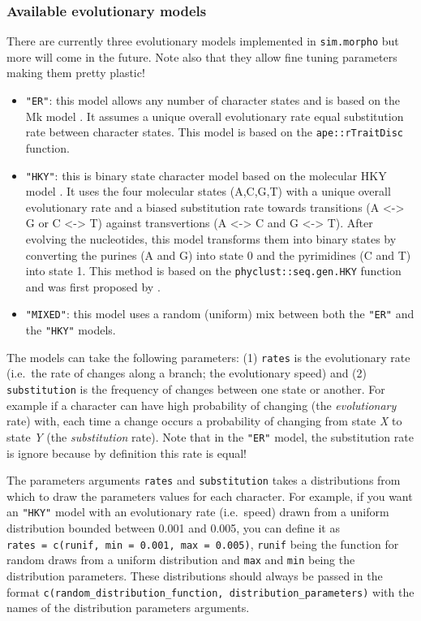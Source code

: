 \documentclass[]{book}
\providecommand{\tightlist}{%
  \setlength{\itemsep}{0pt}\setlength{\parskip}{0pt}}
\theoremstyle{definition}
\theoremstyle{definition}
\theoremstyle{definition}
\theoremstyle{remark}
\begin{document}
\subsubsection{Available evolutionary
models}\label{available-evolutionary-models}

There are currently three evolutionary models implemented in
\texttt{sim.morpho} but more will come in the future. Note also that
they allow fine tuning parameters making them pretty plastic!

\begin{itemize}
\tightlist
\item
  \texttt{"ER"}: this model allows any number of character states and is
  based on the Mk model \citep{lewisa2001}. It assumes a unique overall
  evolutionary rate equal substitution rate between character states.
  This model is based on the \texttt{ape::rTraitDisc} function.
\item
  \texttt{"HKY"}: this is binary state character model based on the
  molecular HKY model \citep{HKY85}. It uses the four molecular states
  (A,C,G,T) with a unique overall evolutionary rate and a biased
  substitution rate towards transitions (A \textless{}-\textgreater{} G
  or C \textless{}-\textgreater{} T) against transvertions (A
  \textless{}-\textgreater{} C and G \textless{}-\textgreater{} T).
  After evolving the nucleotides, this model transforms them into binary
  states by converting the purines (A and G) into state 0 and the
  pyrimidines (C and T) into state 1. This method is based on the
  \texttt{phyclust::seq.gen.HKY} function and was first proposed by
  \citet{OReilly2016}.
\item
  \texttt{"MIXED"}: this model uses a random (uniform) mix between both
  the \texttt{"ER"} and the \texttt{"HKY"} models.
\end{itemize}

The models can take the following parameters: (1) \texttt{rates} is the
evolutionary rate (i.e.~the rate of changes along a branch; the
evolutionary speed) and (2) \texttt{substitution} is the frequency of
changes between one state or another. For example if a character can
have high probability of changing (the \emph{evolutionary} rate) with,
each time a change occurs a probability of changing from state \emph{X}
to state \emph{Y} (the \emph{substitution} rate). Note that in the
\texttt{"ER"} model, the substitution rate is ignore because by
definition this rate is equal!

The parameters arguments \texttt{rates} and \texttt{substitution} takes
a distributions from which to draw the parameters values for each
character. For example, if you want an \texttt{"HKY"} model with an
evolutionary rate (i.e.~speed) drawn from a uniform distribution bounded
between 0.001 and 0.005, you can define it as
\texttt{rates\ =\ c(runif,\ min\ =\ 0.001,\ max\ =\ 0.005)},
\texttt{runif} being the function for random draws from a uniform
distribution and \texttt{max} and \texttt{min} being the distribution
parameters. These distributions should always be passed in the format
\texttt{c(random\_distribution\_function,\ distribution\_parameters)}
with the names of the distribution parameters arguments.
\end{document}
